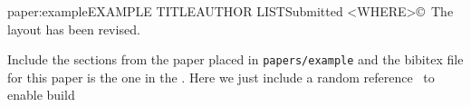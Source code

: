 \begin{paper}{paper:example}{\large EXAMPLE TITLE}{AUTHOR LIST}{Submitted <WHERE>}{\copyright\ <WHO HAS COPYRIGHT>}{The layout has been revised.}

  Include the sections from the paper placed in \texttt{papers/example} and the bibitex file for this paper is the one in the .
  Here we just include a random reference~\cite{idc-prediction} to enable build

  

\tocless
\end{paper}




